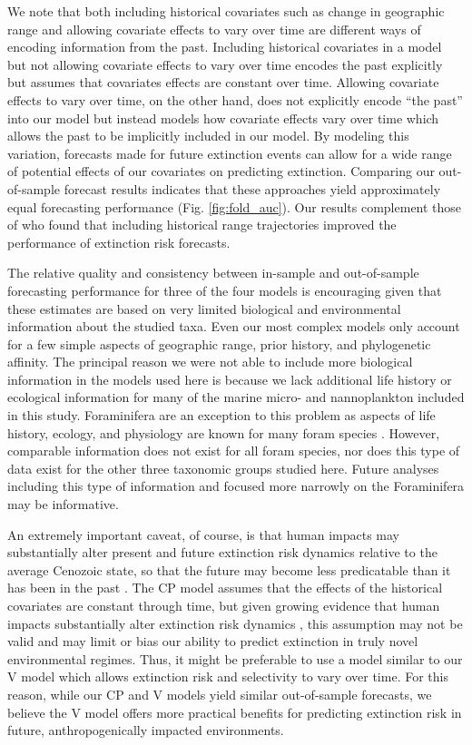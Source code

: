 \documentclass[12pt,letterpaper]{article}
\begin{document}
\begin{refsection}
We note that both including historical covariates such as change in geographic range and allowing covariate effects to vary over time are different ways of encoding information from the past. Including historical covariates in a model but not allowing covariate effects to vary over time encodes the past explicitly but assumes that covariates effects are constant over time. Allowing covariate effects to vary over time, on the other hand, does not explicitly encode ``the past'' into our model but instead models how covariate effects vary over time which allows the past to be implicitly included in our model. By modeling this variation, forecasts made for future extinction events can allow for a wide range of potential effects of our covariates on predicting extinction. Comparing our out-of-sample forecast results indicates that these approaches yield approximately equal forecasting performance (Fig. \ref{fig:fold_auc}). Our results complement those of \citet{Kiessling2016} who found that including historical range trajectories improved the performance of extinction risk forecasts.

The relative quality and consistency between in-sample and out-of-sample forecasting performance for three of the four models is encouraging given that these estimates are based on very limited biological and environmental information about the studied taxa. Even our most complex models only account for a few simple aspects of geographic range, prior history, and phylogenetic affinity. The principal reason we were not able to include more biological information in the models used here is because we lack additional life history or ecological information for many of the marine micro- and nannoplankton included in this study. Foraminifera are an exception to this problem as aspects of life history, ecology, and physiology are known for many foram species \citep{Ezard2011}. However, comparable information does not exist for all foram species, nor does this type of data exist for the other three taxonomic groups studied here. Future analyses including this type of information and focused more narrowly on the Foraminifera may be informative. 

An extremely important caveat, of course, is that human impacts may substantially alter present and future extinction risk dynamics relative to the average Cenozoic state, so that the future may become less predicatable than it has been in the past \citep{Harnik2012a,Finnegan2015}. The CP model assumes that the effects of the historical covariates are constant through time, but given growing evidence that human impacts substantially alter extinction risk dynamics \citep{Harnik2012a,Finnegan2015,Payne2007}, this assumption may not be valid and may limit or bias our ability to predict extinction in truly novel environmental regimes. Thus, it might be preferable to use a model similar to our V model which allows extinction risk and selectivity to vary over time. For this reason, while our CP and V models yield similar out-of-sample forecasts, we believe the V model offers more practical benefits for predicting extinction risk in future, anthropogenically impacted environments.


\end{refsection}
\end{document}
